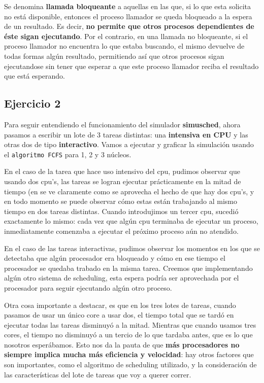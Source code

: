 \documentclass[11pt, a4paper, twoside]{article}
\begin{document}
Se denomina \textbf{llamada bloqueante} a aquellas en las que, si lo que esta  
solicita no está disponible, entonces el proceso llamador se queda bloqueado a la espera de un
resultado. Es decir, \textbf{no permite que otros procesos dependientes de éste sigan ejecutando}. Por 
el contrario, en una llamada no bloqueante, si el proceso llamador no encuentra lo que estaba
buscando, el mismo devuelve de todas formas algún resultado, permitiendo así que otros procesos
sigan ejecutandose sin tener que esperar a que este proceso llamador reciba el resultado que está
esperando. 





\clearpage
\subsection{Ejercicio 2}
Para seguir entendiendo el funcionamiento del simulador \textbf{simusched}, ahora pasamos a escribir un lote
de 3 tareas distintas: una \textbf{intensiva en CPU} y las otras dos de tipo \textbf{interactivo}. 
Vamos a ejecutar y graficar la simulación usando el \texttt{algoritmo FCFS} para 1, 2 y 3 núcleos. 

En el caso de la tarea que hace uso intensivo del cpu, pudimos observar que usando dos cpu's, las
tareas se logran ejecutar prácticamente en la mitad de tiempo (en  se ve claramente como
se aprovecha el hecho de que hay dos cpu's, y en todo momento se puede observar cómo estas están 
trabajando al mismo tiempo en dos tareas distintas. Cuando introdujimos un tercer cpu, sucedió 
exactamente lo mismo: cada vez que algún cpu terminaba de ejecutar un proceso, inmediatamente
comenzaba a ejecutar el próximo proceso aún no atendido. 

En el caso de las tareas interactivas, pudimos observar los momentos en los que se detectaba que 
algún procesador era bloqueado y cómo en ese tiempo el procesador se quedaba trabado en la misma 
tarea. Creemos que implementando algún otro sistema de scheduling, esta espera podría ser aprovechada 
por el procesador para seguir ejecutando algún otro proceso. 

Otra cosa importante a destacar, es que en los tres lotes de tareas, cuando pasamos de usar un único
core a usar dos, el tiempo total que se tardó en ejecutar todas las tareas disminuyó a la mitad.
Mientras que cuando usamos tres cores, el tiempo no disminuyó a un tercio de lo que tardaba antes,
que es lo que nosotros esperábamos. Esto nos da la pauta de que \textbf{más procesadores no siempre implica
mucha más eficiencia y velocidad}: hay otros factores que son importantes, como el algoritmo de
scheduling utilizado, y la consideración de las características del lote de tareas que voy a querer
correr. 
\end{document}
